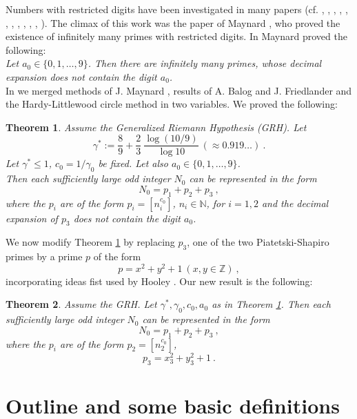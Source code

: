 \documentclass{amsart}
\newtheorem{theorem}{Theorem}[section]
\numberwithin{equation}{subsection}
\begin{document}
Numbers with restricted digits have been investigated in many papers (cf. \cite{Banks1}, \cite{Banks2}, \cite{Bourgain}, \cite{Dartyge1}, \cite{Dimitrov1},  \cite{Dimitrov2},  \cite{Dartyge2}, \cite{Drmota}, \cite{Erdos1}, \cite{Erdos2}, \cite{Konyagin}, \cite{Mauduit}). The climax of this work was the paper of Maynard \cite{maynard}, who proved the existence of infinitely many primes with restricted digits. In \cite{maynard} Maynard proved the following:\\
\textit{Let $a_0\in\{0,1,\ldots,9 \}$. Then there are infinitely many primes, whose decimal expansion does not contain the digit $a_0$.}\\
In \cite{maier-rassias-gold} we merged methods of J. Maynard \cite{maynard}, results of A. Balog and J. Friedlander \cite{balog} and the Hardy-Littlewood circle method in two variables. We proved the following:

\begin{theorem}\label{thm11}
Assume the Generalized Riemann Hypothesis (GRH). Let 
$$\gamma^*:=\frac{8}{9}+\frac{2}{3}\:\frac{\log(10/9)}{\log 10}\:(\approx 0.919\ldots)\:.$$
Let $\gamma^* \leq 1$, $c_0=1/\gamma_0$ be fixed. Let also $a_0\in\{0,1,\ldots, 9\}$.\\
Then each sufficiently large odd integer $N_0$ can be represented in the form 
$$N_0=p_1+p_2+p_3\:,$$
where the $p_i$ are of the form $p_i=[n_i^{c_0}]$, $n_i\in\mathbb{N}$, for $i=1,2$ and the decimal expansion of $p_3$ does not contain the digit $a_0$.
\end{theorem}

We now modify Theorem \ref{thm11} by replacing $p_3$, one of the two Piatetski-Shapiro primes by a prime $p$ of the form 
$$p=x^2+y^2+1\ (x, y\in \mathbb{Z})\:,$$
incorporating ideas fist used by Hooley \cite{hooley}.
Our new result is the following:

\begin{theorem}\label{thm12}
Assume the GRH. Let $\gamma^*, \gamma_0, c_0, a_0$ as in Theorem \ref{thm11}. Then each sufficiently large odd integer $N_0$ can be represented in the form 
$$N_0=p_1+p_2+p_3\:,$$
where the $p_i$ are of the form $p_2=[n_2^{c_0}]$, 
$$p_3=x_3^2+y_3^2+1\:.$$
\end{theorem}



\section{Outline and some basic definitions}
\end{document}
